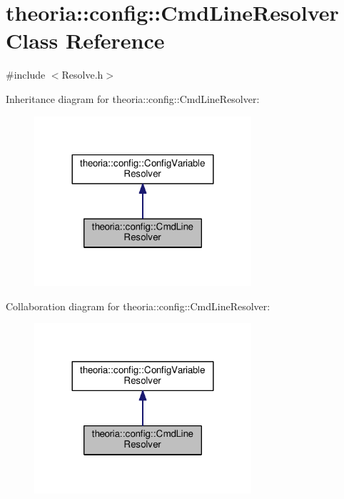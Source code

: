 \hypertarget{classtheoria_1_1config_1_1CmdLineResolver}{}\section{theoria\+:\+:config\+:\+:Cmd\+Line\+Resolver Class Reference}
\label{classtheoria_1_1config_1_1CmdLineResolver}


{\ttfamily \#include $<$Resolve.\+h$>$}



Inheritance diagram for theoria\+:\+:config\+:\+:Cmd\+Line\+Resolver\+:
\nopagebreak
\begin{figure}[H]
\begin{center}
\leavevmode
\includegraphics[width=228pt]{classtheoria_1_1config_1_1CmdLineResolver__inherit__graph}
\end{center}
\end{figure}


Collaboration diagram for theoria\+:\+:config\+:\+:Cmd\+Line\+Resolver\+:
\nopagebreak
\begin{figure}[H]
\begin{center}
\leavevmode
\includegraphics[width=228pt]{classtheoria_1_1config_1_1CmdLineResolver__coll__graph}
\end{center}
\end{figure}
